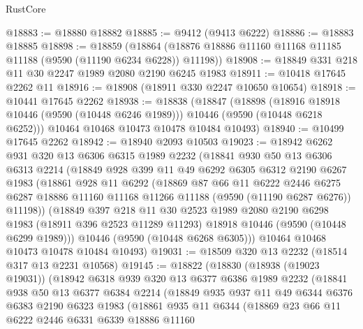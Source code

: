 \begin{lexlean}{RustCore}
\begin{coremodule}
@18883 := @18880 @18882
@18885 := @9412 (@9413 @6222)
@18886 := @18883 @18885
@18898 := @18859
    (@18864 (@18876 @18886 @11160 @11168 @11185 @11188 (@9590 (@11190 @6234 @6228)) @11198))
@18908 := @18849 @331 @218 @11 @30 @2247 @1989 @2080 @2190 @6245 @1983
@18911 := @10418 @17645 @2262 @11
@18916 := @18908 (@18911 @330 @2247 @10650 @10654)
@18918 := @10441 @17645 @2262
@18938 := @18838
    (@18847
      (@18898
        (@18916 @18918 @10446 (@9590 (@10448 @6246 @1989)))
        @10446
        (@9590 (@10448 @6218 @6252)))
      @10464
      @10468
      @10473
      @10478
      @10484
      @10493)
@18940 := @10499 @17645 @2262
@18942 := @18940 @2093 @10503
@19023 := @18942
    @6262
    @931
    @320
    @13
    @6306
    @6315
    @1989
    @2232
    (@18841
      @930
      @50
      @13
      @6306
      @6313
      @2214
      (@18849
        @928
        @399
        @11
        @49
        @6292
        @6305
        @6312
        @2190
        @6267
        @1983
        (@18861
          @928
          @11
          @6292
          (@18869
            @87
            @66
            @11
            @6222
            @2446
            @6275
            @6287
            @18886
            @11160
            @11168
            @11266
            @11188
            (@9590 (@11190 @6287 @6276))
            @11198))
        (@18849
          @397
          @218
          @11
          @30
          @2523
          @1989
          @2080
          @2190
          @6298
          @1983
          (@18911 @396 @2523 @11289 @11293)
          @18918
          @10446
          (@9590 (@10448 @6299 @1989)))
        @10446
        (@9590 (@10448 @6268 @6305)))
      @10464
      @10468
      @10473
      @10478
      @10484
      @10493)
@19031 := @18509 @320 @13 @2232 (@18514 @317 @13 @2231 @10568)
@19145 := @18822
    (@18830
      (@18938 (@19023 @19031))
      (@18942
        @6318
        @939
        @320
        @13
        @6377
        @6386
        @1989
        @2232
        (@18841
          @938
          @50
          @13
          @6377
          @6384
          @2214
          (@18849
            @935
            @937
            @11
            @49
            @6344
            @6376
            @6383
            @2190
            @6323
            @1983
            (@18861
              @935
              @11
              @6344
              (@18869
                @23
                @66
                @11
                @6222
                @2446
                @6331
                @6339
                @18886
                @11160

\end{coremodule}
\end{lexlean}
